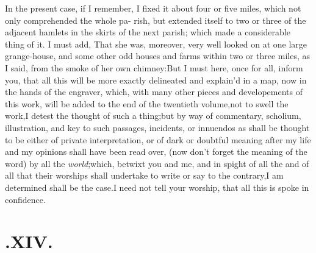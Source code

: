 \documentclass{article}
\begin{document}
In the present case, if I remember, I fixed it about four or
five miles, which not only comprehended the whole pa- rish, but
extended itself to two or three of the adjacent hamlets in the
skirts of the next parish; which made a considerable thing of it. I
must add, That she was, moreover, very well looked on at one large
grange-house, and some other odd houses and farms within two or
three miles, as I said, from the smoke of her own
chimney:\tsh  But I must here, once for all, inform you,
that all this will be more exactly delineated and explain’d
in a map, now in the hands of the engraver, which, with many other
pieces and developements of this work, will be added to the end of
the twentieth volume,\tsk  not to swell the work,\tsk  I detest
the thought of such a thing;\tsk  but by way of commentary,
scholium, illustration, and key to such passages, incidents, or
innuendos as shall be thought to be either of private
interpretation, or of dark or doubtful meaning after my life and
my opinions shall have been read over, (now don’t forget the
meaning of the word) by all the \textit{world};\tsh  which,
betwixt you and me, and in spight of all the\break 
{} and of all that their worships shall
under\-take to write or say to the contrary,\tsh\break  I am determined
shall be the case.\tsk  I need not tell your worship, that all
this is spoke in confidence.

\null
\section{.\enspace XIV.}
\end{document}
